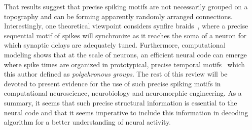 \documentclass[brainsci, %
               review,submit,pdftex,moreauthors
               ]{Definitions/mdpi}
\begin{document}
That results suggest that precise spiking motifs are not necessarily grouped on a topography and can be forming apparently randomly arranged connections. Interestingly, one theoretical viewpoint considers synfire braids~\citep{bienenstock_model_1995}, where a precise sequential motif of spikes will synchronize as it reaches the soma of a neuron for which synaptic delays are adequately tuned. Furthermore, computational modeling shows that at the scale of neurons, an efficient neural code can emerge where spike times are organized in prototypical, precise temporal motifs~\citep{izhikevich_polychronization_2006} which this author defined as \emph{polychronous groups}. The rest of this review will be devoted to present evidence for the use of such precise spiking motifs in computational neuroscience, neurobiology and neuromorphic engineering. As a summary, it seems that such precise structural information is essential to the neural code and that it seems imperative to include this information in decoding algorithm for a better understanding of neural activity.
%
\end{document}
